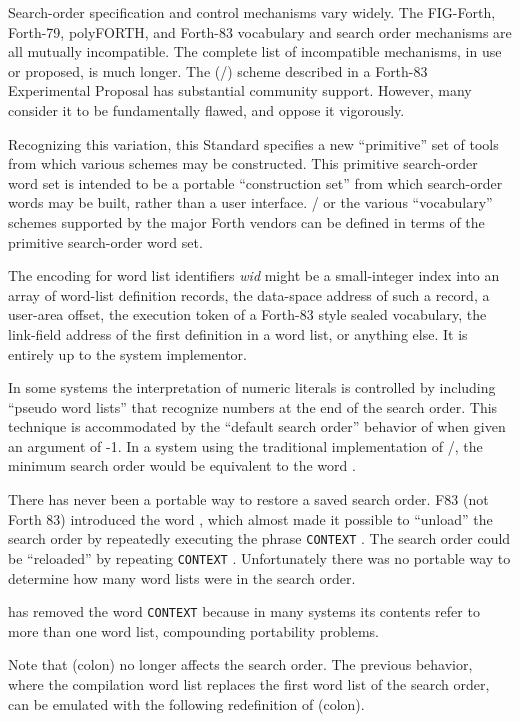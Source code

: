 Search-order specification and control mechanisms vary widely. The
FIG-Forth, Forth-79, polyFORTH, and Forth-83 vocabulary and search
order mechanisms are all mutually incompatible. The complete list of
incompatible mechanisms, in use or proposed, is much longer. The
(/) scheme described in a Forth-83 Experimental
Proposal has substantial community support. However, many consider it
to be fundamentally flawed, and oppose it vigorously.

Recognizing this variation, this Standard specifies a new ``primitive''
set of tools from which various schemes may be constructed. This
primitive search-order word set is intended to be a portable
``construction set'' from which search-order words may be built,
rather than a user interface. / or the various
``vocabulary'' schemes supported by the major Forth vendors can be
defined in terms of the primitive search-order word set.

The encoding for word list identifiers \emph{wid} might be a
small-integer index into an array of word-list definition records, the
data-space address of such a record, a user-area offset, the execution
token of a Forth-83 style sealed vocabulary, the link-field address of
the first definition in a word list, or anything else. It is entirely
up to the system implementor.

In some systems the interpretation of numeric literals is controlled
by including ``pseudo word lists'' that recognize numbers at the end
of the search order. This technique is accommodated by the ``default
search order'' behavior of  when given an argument of
-1. In a system using the traditional implementation of
/, the minimum search order would be equivalent
to the word .

There has never been a portable way to restore a saved search order.
F83 (not Forth 83) introduced the word , which almost
made it possible to ``unload'' the search order by repeatedly executing
the phrase \texttt{CONTEXT}  . The search
order could be ``reloaded'' by repeating  \texttt{CONTEXT}
\word{!}. Unfortunately there was no portable way to determine
how many word lists were in the search order.

 has removed the word \texttt{CONTEXT} because in many systems
its contents refer to more than one word list, compounding portability
problems.

Note that \word{:} (colon) no longer affects the search order. The
previous behavior, where the compilation word list replaces the first
word list of the search order, can be emulated with the following
redefinition of \word{:} (colon).

